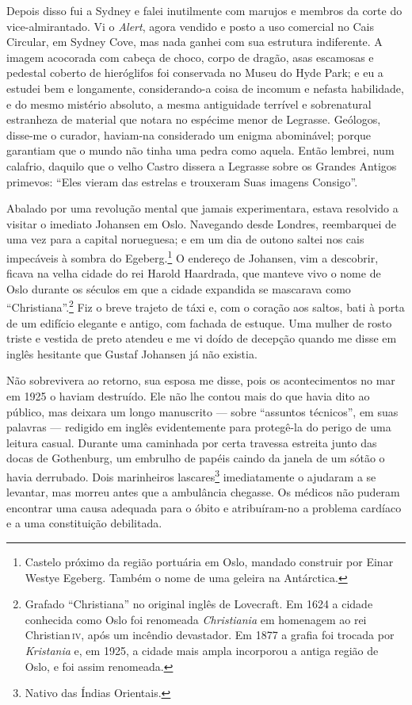 Depois disso fui a Sydney e falei inutilmente com marujos e membros da
corte do vice-almirantado. Vi o \emph{Alert}, agora vendido e posto a
uso comercial no Cais Circular, em Sydney Cove, mas nada ganhei com sua
estrutura indiferente. A imagem acocorada com cabeça de choco, corpo de
dragão, asas escamosas e pedestal coberto de hieróglifos foi conservada
no Museu do Hyde Park; e eu a estudei bem e longamente, considerando-a
coisa de incomum e nefasta habilidade, e do mesmo mistério absoluto, a
mesma antiguidade terrível e sobrenatural estranheza de material que
notara no espécime menor de Legrasse. Geólogos, disse-me o curador,
haviam-na considerado um enigma abominável; porque garantiam que o mundo
não tinha uma pedra como aquela. Então lembrei, num calafrio, daquilo
que o velho Castro dissera a Legrasse sobre os Grandes Antigos primevos:
``Eles vieram das estrelas e trouxeram Suas imagens Consigo''.

Abalado por uma revolução mental que jamais experimentara, estava
resolvido a visitar o imediato Johansen em Oslo. Navegando desde
Londres, reembarquei de uma vez para a capital norueguesa; e em um dia
de outono saltei nos cais impecáveis à sombra do Egeberg.\footnote{Castelo
  próximo da região portuária em Oslo, mandado construir por Einar
  Westye Egeberg. Também o nome de uma geleira na
  Antárctica.} O endereço de Johansen, vim a descobrir, ficava na velha
cidade do rei Harold Haardrada, que manteve vivo o nome de Oslo durante
os séculos em que a cidade expandida se mascarava como
``Christiana''.\footnote{Grafado ``Christiana'' no original inglês de
  Lovecraft. Em 1624 a cidade conhecida como Oslo foi renomeada
  \emph{Christiania} em homenagem ao rei Christian\,\textsc{iv}, após um incêndio
  devastador. Em 1877 a grafia foi trocada por \emph{Kristania} e, em
  1925, a cidade mais ampla incorporou a antiga região de Oslo, e foi
  assim renomeada.} Fiz o breve trajeto de táxi e, com o coração aos
saltos, bati à porta de um edifício elegante e antigo, com fachada de
estuque. Uma mulher de rosto triste e vestida de preto atendeu e me vi
doído de decepção quando me disse em inglês hesitante que Gustaf
Johansen já não existia.

Não sobrevivera ao retorno, sua esposa me disse, pois os
acontecimentos no mar em 1925 o haviam destruído. Ele não lhe contou
mais do que havia dito ao público, mas deixara um longo manuscrito ---
sobre ``assuntos técnicos'', em suas palavras --- redigido em inglês
evidentemente para protegê-la do perigo de uma leitura casual. Durante
uma caminhada por certa travessa estreita junto das docas de Gothenburg,
um embrulho de papéis caindo da janela de um sótão o havia derrubado.
Dois marinheiros lascares\footnote{Nativo das Índias Orientais.}
imediatamente o ajudaram a se levantar, mas morreu antes que a
ambulância chegasse. Os médicos não puderam encontrar uma causa adequada
para o óbito e atribuíram-no a problema cardíaco e a uma constituição
debilitada.

